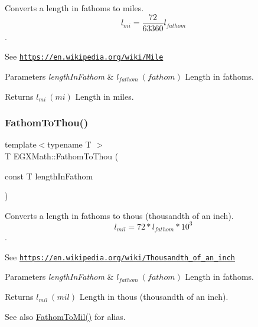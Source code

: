 Converts a length in fathoms to miles. \[ l_{mi}=\frac{72}{63360} l_{fathom} \]. 

See \href{https://en.wikipedia.org/wiki/Mile}{\tt https\+://en.\+wikipedia.\+org/wiki/\+Mile} 
\begin{DoxyParams}{Parameters}
{\em length\+In\+Fathom} & $ l_{fathom}\ (fathom)$ Length in fathoms. \\
\hline
\end{DoxyParams}
\begin{DoxyReturn}{Returns}
$ l_{mi}\ (mi)$ Length in miles. 
\end{DoxyReturn}
\mbox{\label{group___e_g_x_math-_conversions-_length_conversions-_imperial-_fathom-_imperial_ga869f851e88866f34c0dca73f1b69bb21}} 
\subsubsection{\texorpdfstring{Fathom\+To\+Thou()}{FathomToThou()}}
{\footnotesize\ttfamily template$<$typename T $>$ \\
T E\+G\+X\+Math\+::\+Fathom\+To\+Thou (\begin{DoxyParamCaption}\item[{const T}]{length\+In\+Fathom }\end{DoxyParamCaption})}



Converts a length in fathoms to thous (thousandth of an inch). \[ l_{mil}=72 * l_{fathom} * 10^{3} \]. 

See \href{https://en.wikipedia.org/wiki/Thousandth_of_an_inch}{\tt https\+://en.\+wikipedia.\+org/wiki/\+Thousandth\+\_\+of\+\_\+an\+\_\+inch} 
\begin{DoxyParams}{Parameters}
{\em length\+In\+Fathom} & $ l_{fathom}\ (fathom)$ Length in fathoms. \\
\hline
\end{DoxyParams}
\begin{DoxyReturn}{Returns}
$ l_{mil}\ (mil)$ Length in thous (thousandth of an inch). 
\end{DoxyReturn}
\begin{DoxySeeAlso}{See also}
\mbox{\hyperlink{group___e_g_x_math-_conversions-_length_conversions-_imperial-_fathom-_imperial_ga1bdfdd0f208b878241772cc584fa4d1d}{Fathom\+To\+Mil()}} for alias. 
\end{DoxySeeAlso}
\mbox{\label{group___e_g_x_math-_conversions-_length_conversions-_imperial-_fathom-_imperial_ga1f8085825612168639f1db2cd20432cb}} 

